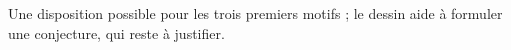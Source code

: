 \par\medskip\noindent\begin{minipage}{\linewidth}\centering
{}
\par\medskip Une disposition possible pour les trois premiers motifs ; le dessin aide à formuler une conjecture, qui reste à justifier.\end{minipage}\par\medskip
